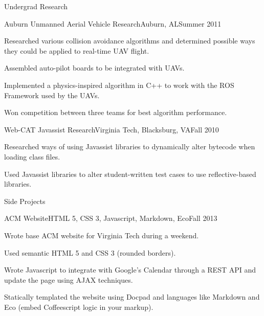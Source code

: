 \documentclass[10pt,a4paper]{article}
\begin{document}
\addvspace{1em}
    {Undergrad Research} {
     \begin{resumeinfo}{Auburn Unmanned Aerial Vehicle Research}{Auburn, AL}{Summer 2011}
         \item Researched various collision avoidance algorithms and determined possible ways they could be
               applied to real-time UAV flight.
         \item Assembled auto-pilot boards to be integrated with UAVs.
         \item Implemented a physics-inspired algorithm in C++ to work with the ROS Framework used by 
               the UAVs.
         \item Won competition between three teams for best algorithm performance.
     \end{resumeinfo}
     \addvspace{1em}
     \begin{resumeinfo}{Web-CAT Javassist Research}{Virginia Tech, Blacksburg, VA}{Fall 2010}
         \item Researched ways of using Javassist libraries to dynamically alter bytecode when loading
               class files.
         \item Used Javassist libraries to alter student-written test cases to use reflective-based
               libraries.
     \end{resumeinfo}
    }
    
\addvspace{1em}
    {Side Projects} {
     \begin{resumeinfo}{ACM Website}{HTML 5, CSS 3, Javascript, Markdown, Eco}{Fall 2013}
         \item Wrote base ACM website for Virginia Tech during a weekend.
         \item Used semantic HTML 5 and CSS 3 (rounded borders).
         \item Wrote Javascript to integrate with Google's Calendar through a REST API
               and update the page using AJAX techniques.
         \item Statically templated the website using Docpad and languages like Markdown
               and Eco (embed Coffeescript logic in your markup).
     \end{resumeinfo}
    }  
\end{document}
